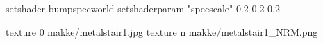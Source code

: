 setshader bumpspecworld
setshaderparam "specscale" 0.2 0.2 0.2

texture 0 makke/metalstair1.jpg
texture n makke/metalstair1_NRM.png
